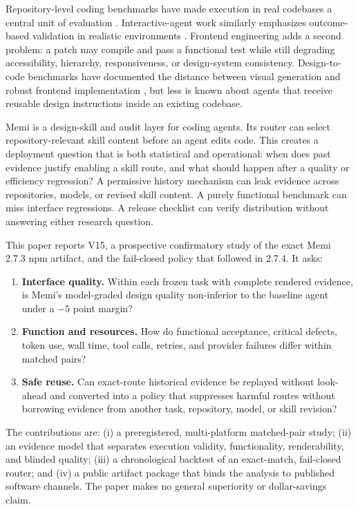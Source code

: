 \documentclass[9pt,twocolumn]{extarticle}
\begin{document}
Repository-level coding benchmarks have made execution in real codebases a
central unit of evaluation \cite{jimenez2024swebench}. Interactive-agent work
similarly emphasizes outcome-based validation in realistic environments
\cite{zhou2024webarena}. Frontend engineering adds a second problem: a patch
may compile and pass a functional test while still degrading accessibility,
hierarchy, responsiveness, or design-system consistency. Design-to-code
benchmarks have documented the distance between visual generation and robust
frontend implementation \cite{si2024design2code}, but less is known about
agents that receive reusable design instructions inside an existing codebase.

Memi is a design-skill and audit layer for coding agents. Its router can select
repository-relevant skill content before an agent edits code. This creates a
deployment question that is both statistical and operational: when does past
evidence justify enabling a skill route, and what should happen after a quality
or efficiency regression? A permissive history mechanism can leak evidence
across repositories, models, or revised skill content. A purely functional
benchmark can miss interface regressions. A release checklist can verify
distribution without answering either research question.

This paper reports V15, a prospective confirmatory study of the exact Memi
2.7.3 npm artifact, and the fail-closed policy that followed in 2.7.4. It asks:

\begin{enumerate}[label=\textbf{RQ\arabic*:},leftmargin=*,labelsep=0.5em]
  \item \textbf{Interface quality.} Within each frozen task with complete
  rendered evidence, is Memi's model-graded design quality non-inferior to the
  baseline agent under a $-5$ point margin?
  \item \textbf{Function and resources.} How do functional acceptance,
  critical defects, token use, wall time, tool calls, retries, and provider
  failures differ within matched pairs?
  \item \textbf{Safe reuse.} Can exact-route historical evidence be replayed
  without look-ahead and converted into a policy that suppresses harmful routes
  without borrowing evidence from another task, repository, model, or skill
  revision?
\end{enumerate}

The contributions are: (i) a preregistered, multi-platform matched-pair study;
(ii) an evidence model that separates execution validity, functionality,
renderability, and blinded quality; (iii) a chronological backtest of an
exact-match, fail-closed router; and (iv) a public artifact package that binds
the analysis to published software channels. The paper makes no general
superiority or dollar-savings claim.
\end{document}
